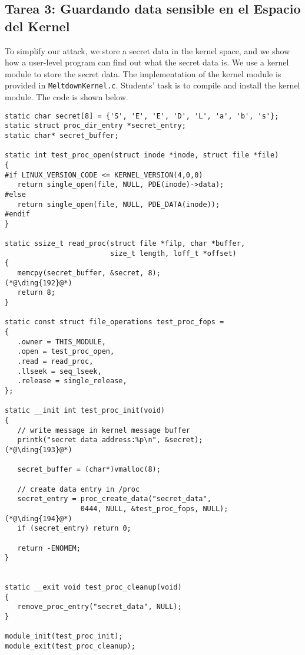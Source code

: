\subsection{Tarea 3: Guardando data sensible en el Espacio del Kernel}

To simplify our attack, we store 
a secret data in the kernel space, and we show how a user-level program can find out what the
secret data is. We use a kernel module to store the secret data.  The implementation of the
kernel module is provided in \texttt{MeltdownKernel.c}. 
Students' task is to compile and install the kernel module. The code is shown below. 


\begin{lstlisting}[caption=\texttt{MeltdownKernel.c}, label=meltdown:list:kernelmodule]
static char secret[8] = {'S', 'E', 'E', 'D', 'L', 'a', 'b', 's'};
static struct proc_dir_entry *secret_entry;
static char* secret_buffer;

static int test_proc_open(struct inode *inode, struct file *file)
{
#if LINUX_VERSION_CODE <= KERNEL_VERSION(4,0,0)
   return single_open(file, NULL, PDE(inode)->data);
#else
   return single_open(file, NULL, PDE_DATA(inode));
#endif
}

static ssize_t read_proc(struct file *filp, char *buffer, 
                         size_t length, loff_t *offset)
{
   memcpy(secret_buffer, &secret, 8);                  (*@\ding{192}@*)
   return 8;
}

static const struct file_operations test_proc_fops =
{
   .owner = THIS_MODULE,
   .open = test_proc_open,
   .read = read_proc,
   .llseek = seq_lseek,
   .release = single_release,
};

static __init int test_proc_init(void)
{
   // write message in kernel message buffer
   printk("secret data address:%p\n", &secret);        (*@\ding{193}@*)

   secret_buffer = (char*)vmalloc(8);

   // create data entry in /proc
   secret_entry = proc_create_data("secret_data", 
                  0444, NULL, &test_proc_fops, NULL);  (*@\ding{194}@*)
   if (secret_entry) return 0;

   return -ENOMEM;
}


static __exit void test_proc_cleanup(void)
{
   remove_proc_entry("secret_data", NULL);
}

module_init(test_proc_init);
module_exit(test_proc_cleanup);
\end{lstlisting}


